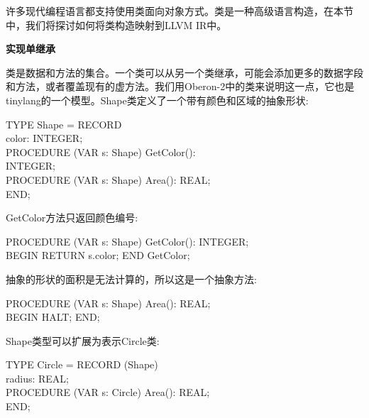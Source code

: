 许多现代编程语言都支持使用类面向对象方式。类是一种高级语言构造，在本节中，我们将探讨如何将类构造映射到LLVM IR中。\par

\hspace*{\fill} \par %
\textbf{实现单继承}

类是数据和方法的集合。一个类可以从另一个类继承，可能会添加更多的数据字段和方法，或者覆盖现有的虚方法。我们用Oberon-2中的类来说明这一点，它也是tinylang的一个模型。Shape类定义了一个带有颜色和区域的抽象形状:\par

\begin{tcolorbox}[colback=white,colframe=black]
TYPE Shape = RECORD \\
\hspace*{3cm}color: INTEGER; \\
\hspace*{3cm}PROCEDURE (VAR s: Shape)  GetColor(): \\
\hspace*{3.5cm}INTEGER; \\
\hspace*{3cm}PROCEDURE (VAR s: Shape) Area(): REAL;\\
\hspace*{2.5cm}END;
\end{tcolorbox}

GetColor方法只返回颜色编号:\par

\begin{tcolorbox}[colback=white,colframe=black]
PROCEDURE (VAR s: Shape) GetColor(): INTEGER; \\
BEGIN RETURN s.color; END GetColor;
\end{tcolorbox}

抽象的形状的面积是无法计算的，所以这是一个抽象方法:\par

\begin{tcolorbox}[colback=white,colframe=black]
PROCEDURE (VAR s: Shape) Area(): REAL; \\
BEGIN HALT; END;
\end{tcolorbox}

Shape类型可以扩展为表示Circle类:\par

\begin{tcolorbox}[colback=white,colframe=black]
TYPE Circle = RECORD (Shape) \\
\hspace*{3cm}radius: REAL; \\
\hspace*{3cm}PROCEDURE (VAR s: Circle) Area(): REAL; \\
\hspace*{2.5cm}END;
\end{tcolorbox}

